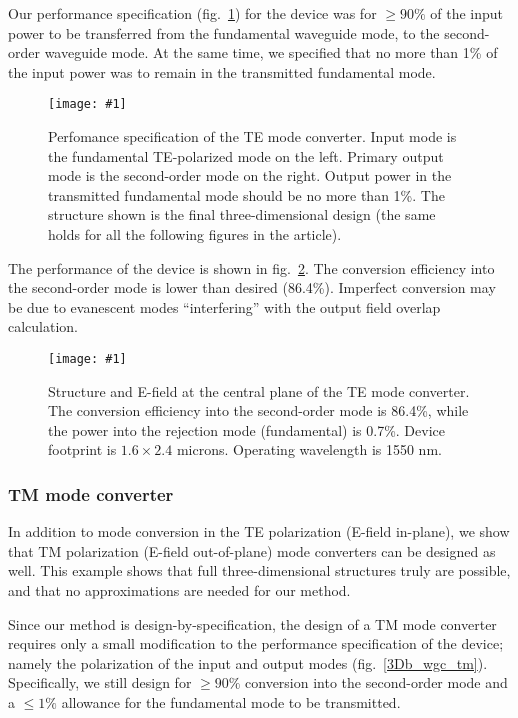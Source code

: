 \documentclass[letterpaper,10pt]{article}
\newcommand{\myfig}[2]{
    \begin{figure}[!h]
    \begin{centering}
    \texttt{[image: \#1]}
    \caption{#2}\label{#1}
    \end{centering}
    \end{figure}
}
\newcommand{\fig}[1]{fig.~\ref{#1}}
\begin{document}
Our performance specification (\fig{3Db_wgc_te2}) 
    for the device was for $\ge90\%$ of the 
    input power to be transferred from the fundamental waveguide mode,
    to the second-order waveguide mode.
At the same time, we specified that no more than 1\% of the input power
    was to remain in the transmitted fundamental mode.

\myfig{3Db_wgc_te2}
    {Perfomance specification of the TE mode converter.
    Input mode is the fundamental TE-polarized mode on the left.
    Primary output mode is the second-order mode on the right.
    Output power in the transmitted fundamental mode 
    should be no more than 1\%.
    The structure shown is the final three-dimensional design
    (the same holds for all the following figures in the article).
    }

The performance of the device is shown in \fig{takeaway}.
The conversion efficiency into the second-order mode is lower
    than desired (86.4\%). 
Imperfect conversion may be due to evanescent modes ``interfering'' 
    with the output field overlap calculation.

\myfig{takeaway}
    {Structure and E-field at the central plane of the TE mode converter.
    The conversion efficiency into the second-order mode is 86.4\%,
    while the power into the rejection mode (fundamental) is 0.7\%.
    Device footprint is $1.6\times2.4$ microns.
    Operating wavelength is 1550 nm.}


\subsubsection{TM mode converter}

In addition to mode conversion in the TE polarization (E-field in-plane),
    we show that TM polarization (E-field out-of-plane) mode converters
    can be designed as well.
This example shows that full three-dimensional structures 
    truly are possible,
    and that no approximations are needed for our method.

Since our method is design-by-specification, 
    the design of a TM mode converter requires only
    a small modification to the performance specification of the device;
    namely the polarization of the input and output modes (\fig{3Db_wgc_tm}).
Specifically, we still design for 
    $\ge 90\%$ conversion into the second-order mode and 
    a $\le 1\%$ allowance for the fundamental mode to be transmitted.
\end{document}
